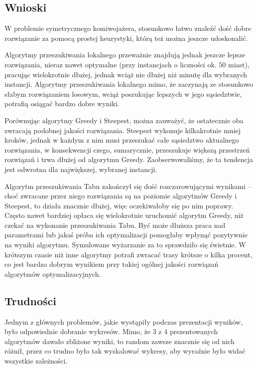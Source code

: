 \subsection{Wnioski}

W problemie symetrycznego komiwojażera, stosunkowo łatwo znaleźć dość dobre rozwiązanie za pomocą prostej heurystyki, którą też można jeszcze udoskonalić.

Algorytmy przeszukiwania lokalnego przeważnie znajdują jednak jeszcze lepsze rozwiązania, nieraz nawet optymalne (przy instancjach o liczności ok. 50 miast), pracując wielokrotnie dłużej, jednak wciąż nie dłużej niż minutę dla wybranych instancji. Algorytmy przeszukiwania lokalnego mimo, że zaczynają ze stosunkowo słabym rozwiązaniem losowym, wciąż poszukując lepszych w jego sąsiedztwie, potrafią osiągać bardzo dobre wyniki.

Porównując algorytmy Greedy i Steepest, można zauważyć, że ostatecznie oba zwracają podobnej jakości rozwiązania. Steepest wykonuje kilkakrotnie mniej kroków, jednak w każdym z nim musi przeszukać całe sąsiedztwo aktualnego rozwiązania, w konsekwencji czego, sumarycznie, przeszukuje większą przestrzeń rozwiązań i trwa dłużej od algorytmu Greedy. Zaobserwowaliśmy, że ta tendencja jest odwrotna dla największej, wybranej instancji.

{\color{part2}
Algorytm przeszukiwania Tabu zakończył się dość rozczarowującymi wynikami -- choć zwracane przez niego rozwiązania są na poziomie algorytmów Greedy i Steepest, to działa znacznie dłużej, więc oczekiwałoby się po nim poprawy. Często nawet bardziej opłaca się wielokrotnie uruchomić algorytm Greedy, niż czekać na wykonanie przeszukiwania Tabu. Być może dłuższa praca nad parametrami lub jakaś próba ich optymalizacji pomogłaby wpłynąć pozytywnie na wyniki algorytmu. Symulowane wyżarzanie za to sprawdziło się świetnie. W krótszym czasie niż inne algorytmy potrafi zwracać trasy krótsze o kilka procent, co jest bardzo dobrym wynikiem przy takiej ogólnej jakości rozwiązań algorytmów optymalizacyjnych.
}

\subsection{Trudności}

Jednym z głównych problemów, jakie wystąpiły podczas prezentacji wyników, było odpowiednie dobranie wykresów. Mimo, że 3 z 4 prezentowanych algorytmów dawało zbliżone wyniki, to random zawsze znacznie się od nich różnił, przez co trudno było tak wyskalować wykresy, aby wyraźnie było widać wszystkie zależności. 

